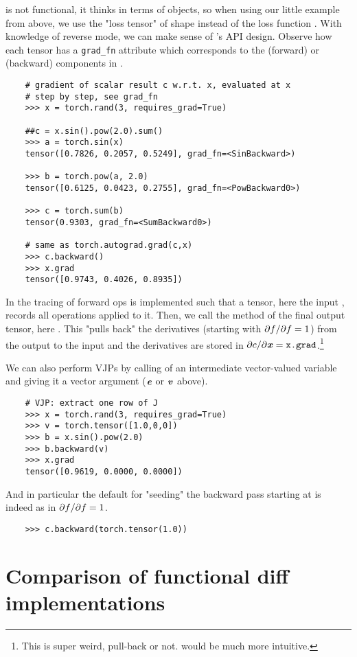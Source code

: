 \documentclass[paper=a4,11pt,headsepline]{scrartcl}
\begin{document}
\pytorch is not functional, it thinks in terms of  objects, so
when using our little example from above, we use the "loss tensor"  of
shape  instead of the loss function . With knowledge of reverse
mode, we can make sense of \pytorch's API design. Observe how each tensor has a
\verb|grad_fn| attribute which corresponds to the  (forward) or
 (backward) components in \jax.
%
\begin{verbatim}
    # gradient of scalar result c w.r.t. x, evaluated at x
    # step by step, see grad_fn
    >>> x = torch.rand(3, requires_grad=True)

    ##c = x.sin().pow(2.0).sum()
    >>> a = torch.sin(x)
    tensor([0.7826, 0.2057, 0.5249], grad_fn=<SinBackward>)

    >>> b = torch.pow(a, 2.0)
    tensor([0.6125, 0.0423, 0.2755], grad_fn=<PowBackward0>)

    >>> c = torch.sum(b)
    tensor(0.9303, grad_fn=<SumBackward0>)

    # same as torch.autograd.grad(c,x)
    >>> c.backward()
    >>> x.grad
    tensor([0.9743, 0.4026, 0.8935])
\end{verbatim}
%
In \pytorch the tracing of forward ops is implemented such that a tensor, here
the input , records all operations applied to it. Then, we call the
 method of the final output tensor, here . This
"pulls back" the derivatives (starting with $\partial f/\partial f=1$) from the output
 to the input and the derivatives are stored in $\partial c/\partial \bm{\mathit{x}} =
\texttt{x.grad}$.\footnote{This is super weird, pull-back or not.
 would be much more intuitive.}

We can also perform VJPs by calling  of an intermediate
vector-valued variable and giving it a vector argument ($\bm{\mathit{e}}$ or $\bm{\mathit{v}}$ above).
%
\begin{verbatim}
    # VJP: extract one row of J
    >>> x = torch.rand(3, requires_grad=True)
    >>> v = torch.tensor([1.0,0,0])
    >>> b = x.sin().pow(2.0)
    >>> b.backward(v)
    >>> x.grad
    tensor([0.9619, 0.0000, 0.0000])
\end{verbatim}
And in particular the default for "seeding" the backward pass starting at 
is indeed  as in $\partial f/\partial f=1$.
\begin{verbatim}
    >>> c.backward(torch.tensor(1.0))
\end{verbatim}

\section{Comparison of functional diff implementations}
\end{document}
